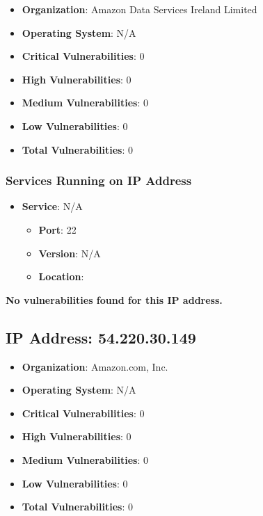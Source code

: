 \documentclass{article}
\begin{document}
\begin{itemize}
    \item \textbf{Organization}: Amazon Data Services Ireland Limited
    \item \textbf{Operating System}:  N/A 
    \item \textbf{Critical Vulnerabilities}: 0
    \item \textbf{High Vulnerabilities}: 0
    \item \textbf{Medium Vulnerabilities}: 0
    \item \textbf{Low Vulnerabilities}: 0
    \item \textbf{Total Vulnerabilities}: 0
\end{itemize}

\subsubsection*{Services Running on IP Address}

\begin{itemize}
    
        \item \textbf{Service}: N/A
        \begin{itemize}
            \item \textbf{Port}: 22
            \item \textbf{Version}:  N/A 
            \item \textbf{Location}: \href{  }{  }
        \end{itemize}
    
\end{itemize}


\textbf{No vulnerabilities found for this IP address.}




\clearpage



\subsection{IP Address: 54.220.30.149}

\begin{itemize}
    \item \textbf{Organization}: Amazon.com, Inc.
    \item \textbf{Operating System}:  N/A 
    \item \textbf{Critical Vulnerabilities}: 0
    \item \textbf{High Vulnerabilities}: 0
    \item \textbf{Medium Vulnerabilities}: 0
    \item \textbf{Low Vulnerabilities}: 0
    \item \textbf{Total Vulnerabilities}: 0
\end{itemize}
\end{document}
